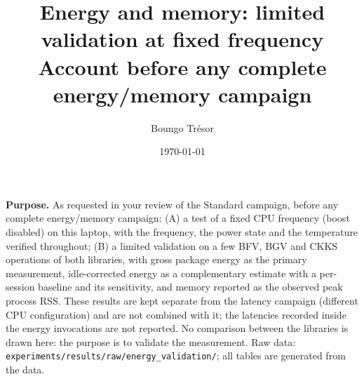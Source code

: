 \documentclass[11pt]{article}
\title{Energy and memory: limited validation at fixed frequency\\[2pt]
\large Account before any complete energy/memory campaign}
\author{Boungo Tr\'esor}
\date{\today}
\begin{document}
\maketitle

\noindent\textbf{Purpose.} As requested in your review of the Standard campaign, before any complete energy/memory campaign: (A) a test of a fixed CPU frequency (boost disabled) on this laptop, with the frequency, the power state and the temperature verified throughout; (B) a limited validation on a few BFV, BGV and CKKS operations of both libraries, with gross package energy as the primary measurement, idle-corrected energy as a complementary estimate with a per-session baseline and its sensitivity, and memory reported as the observed peak process RSS. These results are kept separate from the latency campaign (different CPU configuration) and are not combined with it; the latencies recorded inside the energy invocations are not reported. No comparison between the libraries is drawn here: the purpose is to validate the measurement. Raw data: \texttt{experiments/results/raw/energy\_validation/}; all tables are generated from the data.
\end{document}
